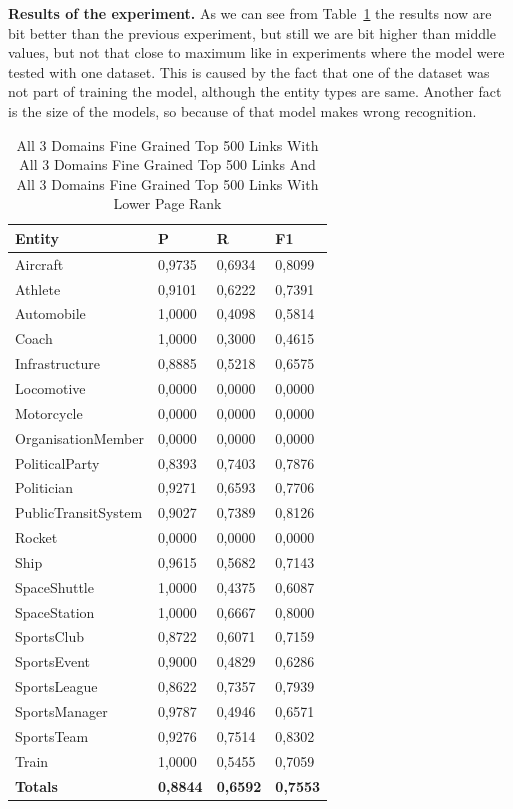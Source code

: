 \documentclass[thesis=M,english]{FITthesis}[2018/05/30]
\begin{document}
\textbf{Results of the experiment.} As we can see from Table~\ref{table:Global500FineDomainTestedWithTwo500Datasets} the results now are bit better than the previous experiment, but still we are bit higher than middle values, but not that close to maximum like in experiments where the model were tested with one dataset. This is caused by the fact that one of the dataset was not part of training the model, although the entity types are same. Another fact is the size of the models, so because of that model makes wrong recognition.

	\begin{table}[H]\centering
		\begin{tabular}{|l|l|l|l|}
			\hline {\textbf{Entity}} & {\textbf{P}} & {\textbf{R}} & {\textbf{F1}}\\\hline
				Aircraft & 0,9735 & 0,6934 & 0,8099\\
				Athlete & 0,9101 & 0,6222 & 0,7391\\
				Automobile & 1,0000 & 0,4098 & 0,5814\\ 
				Coach & 1,0000 & 0,3000 & 0,4615\\
				Infrastructure & 0,8885 & 0,5218 & 0,6575\\
				Locomotive & 0,0000 & 0,0000 & 0,0000\\
				Motorcycle & 0,0000 & 0,0000 & 0,0000\\
				OrganisationMember & 0,0000 & 0,0000 & 0,0000\\				
				PoliticalParty & 0,8393 & 0,7403 & 0,7876\\
				Politician & 0,9271 & 0,6593 & 0,7706\\
				PublicTransitSystem & 0,9027 & 0,7389 & 0,8126\\
				Rocket & 0,0000 & 0,0000 & 0,0000\\				
				Ship & 0,9615 & 0,5682 & 0,7143\\
				SpaceShuttle & 1,0000 & 0,4375 & 0,6087\\
				SpaceStation & 1,0000 & 0,6667 & 0,8000\\ 
				SportsClub & 0,8722 & 0,6071 & 0,7159\\
				SportsEvent & 0,9000 & 0,4829 & 0,6286\\
				SportsLeague & 0,8622 & 0,7357 & 0,7939\\
				SportsManager & 0,9787 & 0,4946 & 0,6571\\
				SportsTeam & 0,9276 & 0,7514 & 0,8302\\
				Train & 1,0000 & 0,5455 & 0,7059\\\hline
				\textbf{Totals} & \textbf{0,8844} & \textbf{0,6592} & \textbf{0,7553}\\\hline
		\end{tabular}
		\caption{All 3 Domains Fine Grained Top 500 Links  With All 3 Domains Fine Grained Top 500 Links And All 3 Domains Fine Grained Top 500 Links With Lower Page Rank \label{table:Global500FineDomainTestedWithTwo500Datasets}}
	\end{table}
\end{document}
